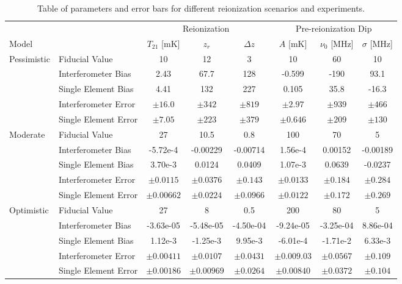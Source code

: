 \documentclass[twolcolumn,apj,iop,numberedappendix]{emulateapj}
\begin{document}
\begin{table}[htbp]
   \centering
   \begin{tabular}{@{} llcccccc @{}} %
      \toprule
      & & \multicolumn{3}{c}{Reionization} & \multicolumn{3}{c}{Pre-reionization Dip} \\
      \cmidrule(lr){3-5} %
      \cmidrule(lr){6-8} 
      Model &  & $T_{21}$ [mK] & $z_r$ & $\Delta z$ & $A$ [mK] & $\nu_0$ [MHz] & $\sigma$ [MHz]\\
      \midrule
      Pessimistic & Fiducial Value & 10 & 12 & 3 & 10 & 60 & 10 \\
      \cmidrule(l){2-8} 
      			 & Interferometer Bias & 2.43 & 67.7 & 128 & -0.599 & -190 & 93.1 \\
			 & Single Element Bias & 4.41 & 132 & 227& 0.105 & 35.8 & -16.3 \\	 
      			 & Interferometer Error & $\pm 16.0$ & $\pm 342$ & $\pm 819$ & $\pm 2.97$ & $\pm 939$ & $\pm 466$ \\
      			 & Single Element Error  & $\pm 7.05$ & $\pm 223$ & $\pm 379$ & $\pm 0.646$ & $\pm 209$ & $\pm 130$ \\
      \midrule
      Moderate & Fiducial Value & 27 & 10.5 & 0.8 & 100 & 70 & 5 \\
      \cmidrule(l){2-8}
			 & Interferometer Bias & -5.72e-4 & -0.00229 & -0.00714 & 1.56e-4 & 0.00152 & -0.00189 \\
			 & Single Element Bias & 3.70e-3 & 0.0124 & 0.0409 & 1.07e-3 & 0.0639 & -0.0237 \\	
      			 & Interferometer Error & $\pm 0.0115$ & $\pm 0.0376$ & $\pm 0.143$ & $\pm 0.0133$ & $\pm 0.184$ & $\pm 0.284$ \\
      			 & Single Element Error  & $\pm 0.00662$ & $\pm 0.0224$ & $\pm 0.0966$ & $\pm 0.0122$ & $\pm 0.172$ & $\pm 0.269$ \\
      \midrule
      Optimistic & Fiducial Value & 27 & 8 & 0.5 & 200 & 80 & 5 \\
      \cmidrule(l){2-8}
			 & Interferometer Bias & -3.63e-05 & -5.48e-05 & -4.50e-04 & -9.24e-05 & -3.25e-04 & 8.86e-04 \\
			 & Single Element Bias & 1.12e-3 & -1.25e-3 & 9.95e-3 & -6.01e-4 & -1.71e-2 & 6.33e-3 \\	
      			 & Interferometer Error & $\pm 0.00411$ & $\pm 0.0107$ & $\pm 0.0431$ & $\pm 0.009.03$ & $\pm 0.0567$ & $\pm 0.109$ \\
      			 & Single Element Error  & $\pm 0.00186$ & $\pm 0.00969$ & $\pm 0.0264$ & $\pm 0.00840$ & $\pm 0.0372$ & $\pm 0.104$ \\
      \bottomrule
   \end{tabular}
   \caption{Table of parameters and error bars for different reionization scenarios and experiments.}
   \label{tab:booktabs}
\end{table}
\end{document}
